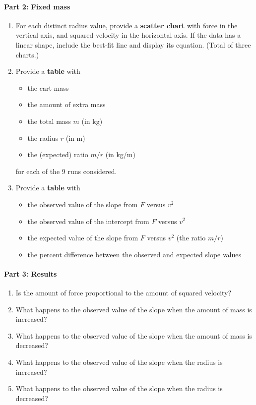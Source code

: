 \paragraph{Part 2: Fixed mass}
%
\begin{enumerate}
    \item For each distinct radius value, provide a \textbf{scatter chart} with force in the vertical axis, and squared velocity in the horizontal axis. If the data has a linear shape, include the best-fit line and display its equation. (Total of three charts.)
    \item Provide a \textbf{table} with
    \begin{itemize}
        \item the cart mass
        \item the amount of extra mass
        \item the total mass $m$ (in kg)
        \item the radius $r$ (in m)
        \item the (expected) ratio $m/r$ (in kg/m)
    \end{itemize}
    for each of the 9 runs considered.
    \item Provide a \textbf{table} with
    \begin{itemize}
        \item the observed value of the slope from $F$ versus $v^{2}$
        \item the observed value of the intercept from $F$ versus $v^{2}$
        \item the expected value of the slope from $F$ versus $v^{2}$ (the ratio $m/r$)
        \item the percent difference between the observed and expected slope values
    \end{itemize}
\end{enumerate}
%
\paragraph{Part 3: Results}
%
\begin{enumerate}
    \item Is the amount of force proportional to the amount of squared velocity?
    \item What happens to the observed value of the slope when the amount of mass is increased?
    \item What happens to the observed value of the slope when the amount of mass is decreased?
    \item What happens to the observed value of the slope when the radius is increased?
    \item What happens to the observed value of the slope when the radius is decreased?
\end{enumerate}
%
\newpage
